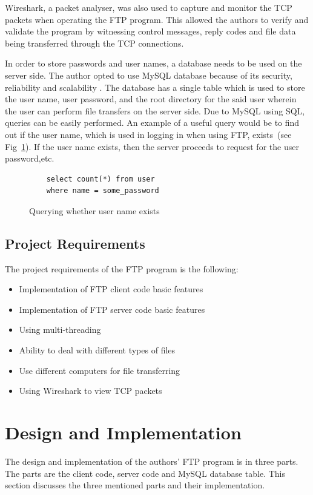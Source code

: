 \documentclass[journal, a4paper]{IEEEtran}
\begin{document}
Wireshark, a packet analyser, was also used to capture and monitor the TCP packets when operating the FTP program. This allowed the authors to verify and validate the program by witnessing control messages, reply codes and file data being transferred through the TCP connections.

In order to store passwords and user names, a database needs to be used on the server side. The author opted to use MySQL database because of its security, reliability and scalability \cite{mysql}. The database has a single table which is used to store the user name, user password, and the root directory for the said user wherein the user can perform file transfers on the server side. Due to MySQL using SQL, queries can be easily performed. An example of a useful query would be to find out if the user name, which is used in logging in when using FTP, exists~(see Fig~\ref{qu}). If the user name exists, then the server proceeds to request for the user password,etc.

\begin{figure}[hbtp]
	\begin{lstlisting}
	select count(*) from user 
	where name = some_password
	\end{lstlisting}
	\caption{Querying whether user name exists}
	\label {qu}
\end{figure}



\subsection{Project Requirements}
The project requirements of the FTP program is the following:

\begin{itemize}
	\item  Implementation of FTP client code basic features
	\item  Implementation of FTP server code basic features
	\item  Using multi-threading
	\item  Ability to deal with different types of files
	\item  Use different computers for file transferring
	\item  Using Wireshark to view TCP packets
\end{itemize}

\section{Design and Implementation}
The design and implementation of the authors' FTP program is in three parts. The parts are the client code, server code and MySQL database table. This section discusses the three mentioned parts and their implementation.
\end{document}
